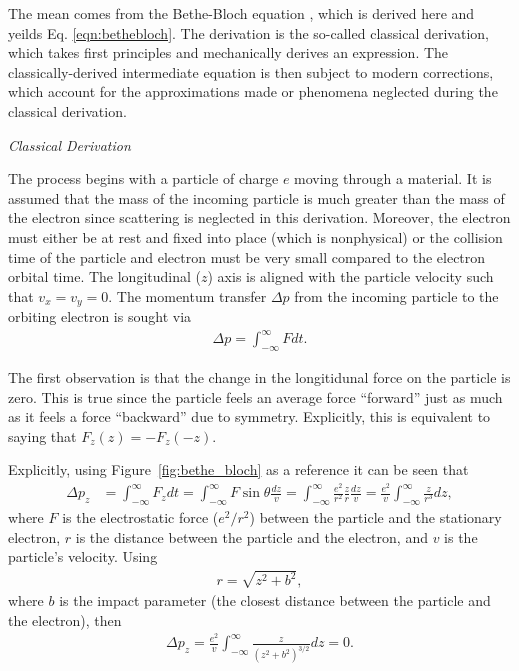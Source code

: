 The mean comes from the Bethe-Bloch equation \cite{bethebloch}, which is derived here and yeilds Eq. \eqref{eqn:bethebloch}. The derivation is the so-called classical derivation, which takes first principles and mechanically derives an expression. The classically-derived intermediate equation is then subject to modern corrections, which account for the approximations made or phenomena neglected during the classical derivation.

\noindent \textit{\large Classical Derivation}

The process begins with a particle of charge $e$ moving through a material. It is assumed that the mass of the incoming particle is much greater than the mass of the electron since scattering is neglected in this derivation. Moreover, the electron must either be at rest and fixed into place (which is nonphysical) or the collision time of the particle and electron must be very small compared to the electron orbital time. The longitudinal ($z$) axis is aligned with the particle velocity such that $v_x=v_y=0$. The momentum transfer $\Delta p$ from the incoming particle to the orbiting electron is sought via
\begin{align*}
\Delta p =  \int_{-\infty} ^\infty F dt.
\end{align*}

The first observation is that the change in the longitidunal force on the particle is zero. This is true since the particle feels an average force ``forward'' just as much as it feels a force ``backward'' due to symmetry. Explicitly, this is equivalent to saying that $F_z(z)=-F_z(-z)$.
\iffalse




Explicitly, using Figure~\ref{fig:bethe_bloch} as a reference it can be seen that
\begin{align*}
\Delta p_z &= \int_{-\infty} ^\infty F_z dt = \int_{-\infty} ^\infty F \sin\theta \frac{dz}{v} = \int_{-\infty} ^\infty \frac{e^2}{r^2} \frac{z}{r} \frac{dz}{v}=\frac{e^2}{v} \int_{-\infty} ^\infty \frac{z}{r^3}dz,
\end{align*}
where $F$ is the electrostatic force ($e^2/r^2$) between the particle and the stationary electron, $r$ is the distance between the particle and the electron, and $v$ is the particle's velocity. Using
\begin{align*}
r=\sqrt{z^2+b^2},
\end{align*}
where $b$ is the impact parameter (the closest distance between the particle and the electron), then
\begin{align*}
\Delta p_z = \frac{e^2}{v} \int_{-\infty} ^\infty \frac{z}{(z^2+b^2)^{3/2}}dz = 0.
\end{align*}


